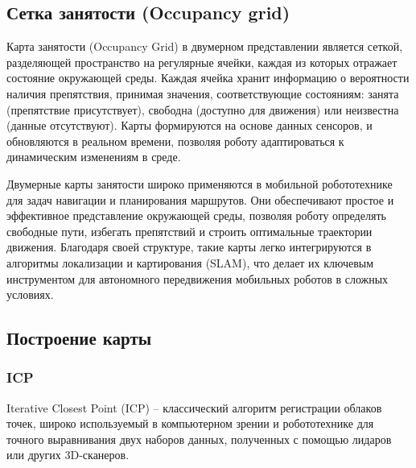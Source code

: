 %
%

\subsection{Сетка занятости (Occupancy grid)}

Карта занятости (Occupancy Grid) в двумерном представлении является сеткой,
разделяющей пространство на регулярные ячейки, каждая из которых отражает
состояние окружающей среды. Каждая ячейка хранит информацию о вероятности
наличия препятствия, принимая значения, соответствующие состояниям: занята
(препятствие присутствует), свободна (доступно для движения) или неизвестна
(данные отсутствуют). Карты формируются на основе данных сенсоров, и обновляются
в реальном времени, позволяя роботу адаптироваться к динамическим изменениям в
среде.

Двумерные карты занятости широко применяются в мобильной робототехнике для задач
навигации и планирования маршрутов. Они обеспечивают простое и эффективное
представление окружающей среды, позволяя роботу определять свободные пути,
избегать препятствий и строить оптимальные траектории движения. Благодаря своей
структуре, такие карты легко интегрируются в алгоритмы локализации и
картирования (SLAM), что делает их ключевым инструментом для автономного
передвижения мобильных роботов в сложных условиях.

\subsection{Построение карты}

\subsubsection{ICP}
Iterative Closest Point (ICP) -- классический алгоритм регистрации облаков
точек, широко используемый в компьютерном зрении и робототехнике для точного
выравнивания двух наборов данных, полученных с помощью лидаров или других
3D-сканеров.

